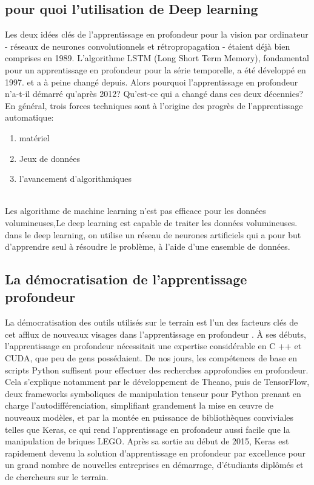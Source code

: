 \documentclass[12pt]{report}
\begin{document}
\subsection{pour quoi l'utilisation de Deep learning}
Les deux idées clés de l'apprentissage en profondeur pour la vision par ordinateur - réseaux de neurones convolutionnels et rétropropagation - étaient déjà bien comprises en 1989. L'algorithme LSTM (Long Short Term Memory), fondamental pour un apprentissage en profondeur pour la série temporelle, a été développé en 1997.
 et a à peine changé depuis. Alors pourquoi l'apprentissage en profondeur n'a-t-il démarré qu'après 2012? Qu'est-ce qui a changé dans ces deux décennies?
En général, trois forces techniques sont à l'origine des progrès de l'apprentissage automatique:
\begin{enumerate}
\item  matériel
\item  Jeux de données
\item l'avancement d'algorithmiques
\end{enumerate}
\\
Les algorithme de machine learning n’est pas efficace pour les données volumineuses,Le deep learning est capable de traiter les données volumineuses.\\
dans le deep learning, on utilise un réseau de neurones artificiels qui a pour but d'apprendre seul à résoudre le problème, à l'aide d'une ensemble de données.

\subsection{La démocratisation de l'apprentissage profondeur}
La démocratisation des outils utilisés sur le terrain est l’un des facteurs clés de cet afflux de nouveaux visages dans l'apprentissage en profondeur \cite{ref12} . À ses débuts, l'apprentissage en profondeur nécessitait une expertise considérable en C ++ et CUDA, que peu de gens possédaient. De nos jours, les compétences de base en scripts Python suffisent pour effectuer des recherches approfondies en profondeur. Cela s’explique notamment par le développement de Theano, puis de TensorFlow, deux frameworks symboliques de manipulation tenseur pour Python prenant en charge l'autodifférenciation, simplifiant grandement la mise en œuvre de nouveaux modèles, et par la montée en puissance de bibliothèques conviviales telles que Keras, ce qui rend l'apprentissage en profondeur aussi facile que la manipulation de briques LEGO. Après sa sortie au début de 2015, Keras est rapidement devenu la solution d'apprentissage en profondeur par excellence pour un grand nombre de nouvelles entreprises en démarrage, d'étudiants diplômés et de chercheurs sur le terrain.
\end{document}
